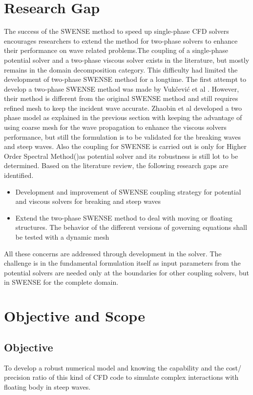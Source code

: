 \documentclass[preprint,12pt]{article}
\begin{document}
{\section{Research Gap}
The success of the SWENSE method to speed up single-phase CFD solvers encourages researchers to extend the method for two-phase solvers to enhance their performance on wave related problems.The coupling of a single-phase potential solver and a two-phase viscous solver exists in the literature, but mostly remains in the domain decomposition category. This difficulty had limited the development of two-phase SWENSE method for a longtime. The first attempt to develop a two-phase SWENSE method was made by Vukčević et al \cite{Vukcevic2016}. However, their method is different from the original SWENSE method and still requires refined mesh to keep the incident wave accurate. Zhaobin et al \cite{zhaobin_progress} developed a two phase model as explained in the previous section with keeping the advantage of using coarse mesh for the wave propagation to enhance the viscous solvers performance, but still the  formulation is to be validated for the breaking waves and steep waves. Also the coupling for SWENSE is carried out is only for Higher Order Spectral Method(\cite{DUCROZET201219})as potential solver  and its robustness is still lot to be determined. Based on the literature review, the following research gaps are identified. 
\begin{itemize}
    \item Development and improvement of SWENSE coupling strategy for potential and viscous solvers for breaking and steep waves
    \item Extend the two-phase SWENSE method to deal with moving or floating structures. The behavior of the different versions of governing equations shall be tested with a dynamic mesh
\end{itemize}
All these concerns are addressed through development in the solver. The challenge is in the fundamental formulation itself as input parameters from the potential solvers are needed only at the boundaries for other coupling solvers, but in SWENSE for the complete domain.  \par






\section{Objective and Scope}
\subsection*{Objective}
To develop a robust numerical model and knowing the capability and the cost/ precision ratio of this kind of CFD code to simulate complex interactions with floating body in steep waves. 
}
\end{document}
